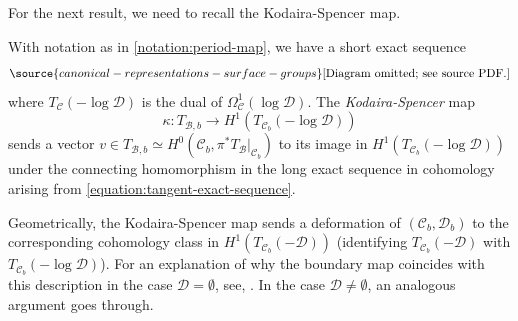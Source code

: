 For the next result, we need to recall the Kodaira-Spencer map.
\begin{definition}
\notready
	\label{definition:kodaira-spencer}
	With notation as in \autoref{notation:period-map},
we have a short exact sequence
\begin{equation}
	\label{equation:tangent-exact-sequence}
\source{canonical-representations-surface-groups}
	\text{[Diagram omitted; see source PDF.]}\end{equation}
where $T_{\mathscr{C}}(-\log\mathscr{D})$ is the dual of $\Omega^1_{\mathscr{C}}(\log \mathscr{D})$.
The {\em Kodaira-Spencer} map $$\kappa: T_{\mathscr{B}, b}\to H^1(T_{\mathscr{C}_b}(-\log\mathscr{D}))$$ sends
a vector $v \in T_{\mathscr B,b} \simeq H^0(\mathscr C_b, \pi^* T_{\mathscr B}|_{\mathscr C_b})$ to its image in
$H^1(T_{\mathscr{C}_b}(-\log\mathscr{D}))$ under the connecting homomorphism in the long exact sequence in cohomology arising from \eqref{equation:tangent-exact-sequence}.
\end{definition}


\begin{remark}
\notready
	\label{remark:kodaira-spencer}
	Geometrically, the Kodaira-Spencer map sends a deformation of $(\mathscr C_b, \mathscr D_b)$ to the corresponding
cohomology class in $H^1(T_{\mathscr C_b}(-\mathscr D))$ (identifying $T_{\mathscr C_b}(-\mathscr D)$ with $T_{\mathscr{C}_b}(-\log\mathscr{D})$).
For an explanation of why the boundary map coincides with this description in
the case $\mathscr D = \emptyset$, see, \cite[\S9.1.2]{Voisin:hodgeTheory}.
In the case $\mathscr D \neq \emptyset$, an analogous argument goes through.
\end{remark}

